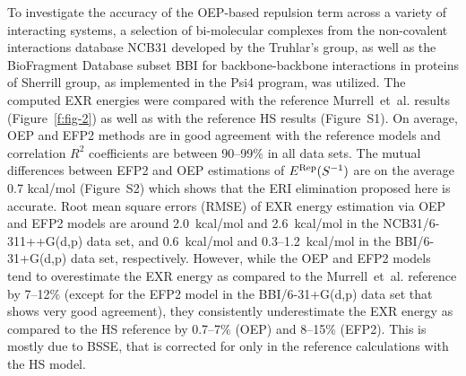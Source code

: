 To investigate the accuracy of the OEP\hyp{}based repulsion
term across
a variety of
interacting systems, a selection of
bi\hyp{}molecular complexes from the non\hyp{}covalent
interactions database NCB31 developed by the Truhlar's 
group,\cite{Zhao.Schultz.Truhlar.JCTC.2006,
Zhao.Truhlar.JCTC.2005,Zhao.Schultz.Truhlar.JCTC.2006,Zhao.Schultz.Truhlar.JCP.2005}
as well as the BioFragment Database subset BBI for backbone\hyp{}backbone
interactions in proteins of Sherrill group,\cite{Burns.Faver.Zheng.Marshall.Smith.Vanommeslaeghe.MacKerell.Merz.Sherrill.JCP.2017} 
as implemented in the {\sc Psi4}
program,\cite{Psi4.JCTC.2017}
was utilized. The computed
EXR energies were compared with the reference Murrell~et~al. results (Figure~\ref{f:fig-2})
as well as with the reference HS results (Figure~S1).
On average, OEP and EFP2 methods are in good agreement
with the reference models and correlation $R^2$ coefficients
are between 90--99\% in all data sets. 
The mutual differences between EFP2 and OEP estimations of 
$E^{\rm Rep}(S^{-1})$ are on the average 0.7 kcal/mol  (Figure~S2) which shows that the ERI elimination proposed here is accurate.
Root mean square errors (RMSE) of EXR energy estimation
via OEP and EFP2 models
are around 2.0~kcal/mol and 2.6~kcal/mol in the NCB31/6-311++G(d,p) data set, and 0.6~kcal/mol 
and 0.3--1.2~kcal/mol
in the BBI/6-31+G(d,p) data set, respectively. However,
while the OEP and EFP2 models tend to overestimate
the EXR energy as compared to the Murrell~et~al. reference
by 7--12\%
(except for the EFP2 model in the BBI/6-31+G(d,p) data set that shows very good agreement), 
they consistently underestimate the EXR energy
as compared to the HS reference by 0.7--7\% (OEP)
and 8--15\% (EFP2).
This is mostly due to BSSE, that is corrected for
only in the reference calculations with the HS model.
%
%
%
%
